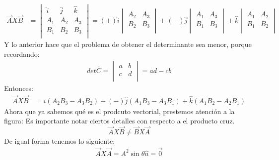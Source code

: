 \documentclass[12pt,openany]{book}
\begin{document}
	    \begin{equation*}
	    	\begin{split}
	    		\vec{A}X\vec{B}&=\begin{vmatrix}
	    							\hat{i} & \hat{j} & \hat{k} \\
	    							 A_{1}  &  A_{2}  & A_{3}   \\
	    							 B_{1}  &  B_{2}  & B_{3}   \\
 	    						\end{vmatrix}
 	    						=(+)\hat{i} \begin{vmatrix}
 	    										A_{2} & A_{3} \\
 	    										B_{2} & B_{3} \\
 	    									\end{vmatrix}
 	    						+(-)\hat{j}\begin{vmatrix}
 	    										A_{1} & A_{3} \\
 	    										B_{1} & B_{3} \\
 	    									\end{vmatrix}
 	    						   +\hat{k}\begin{vmatrix}
 	    										A_{1} & A_{2} \\
 	    										B_{1} & B_{2} \\
 	    									\end{vmatrix}
	    	\end{split}
	    \end{equation*}
	    Y lo anterior hace que el problema de obtener el determinante sea menor, porque recordando:
	    \begin{equation*}
	   		\begin{split}
	    		det \bar{C}=\begin{vmatrix}
 	    						a & b \\
 	    						c & d \\
 	   						\end{vmatrix}
 	   					   =ad - cb  
	    	\end{split}
	    \end{equation*}
	    Entonces:
	    \begin{equation*}
	    	\begin{split}
	    		\vec{A}X\vec{B}&=\hat{i}(A_{2}B_{3}-A_{3}B_{2})
 	    						+(-)\hat{j}(A_{1}B_{3}-A_{3}B_{1})
 	    						   +\hat{k}(A_{1}B_{2}-A_{2}B_{1})
	    	\end{split}
	    \end{equation*}
	   	Ahora que ya sabemos qu\'e es el prodcuto vectorial, prestemos atenci\'on a la figura:
	    Es importante notar ciertos detalles con respecto a el producto cruz.
	    $$
	    		\vec{A}X\vec{B}\neq\vec{B}X\vec{A}
	    $$
	    De igual forma tenemos lo siguiente:
	    \begin{equation*}
	    	\begin{split}
	    		\vec{A}X\vec{A}=A^{2}\sin\theta \hat{u}=\vec{0}
	    	\end{split}
	    \end{equation*}
\end{document}

